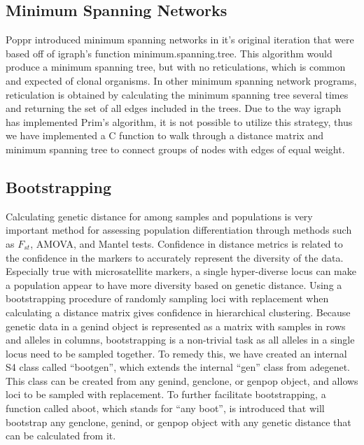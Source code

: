 \documentclass{frontiersSCNS} %
\begin{document}
\subsection*{Minimum Spanning Networks}\label{minimum-spanning-networks}

Poppr introduced minimum spanning networks in it's original iteration
that were based off of igraph's function minimum.spanning.tree. This
algorithm would produce a minimum spanning tree, but with no
reticulations, which is common and expected of clonal organisms. In
other minimum spanning network programs, reticulation is obtained by
calculating the minimum spanning tree several times and returning the
set of all edges included in the trees. Due to the way igraph has
implemented Prim's algorithm, it is not possible to utilize this
strategy, thus we have implemented a C function to walk through a
distance matrix and minimum spanning tree to connect groups of nodes
with edges of equal weight.

\subsection*{Bootstrapping}\label{bootstrapping}

Calculating genetic distance for among samples and populations is very
important method for assessing population differentiation through
methods such as \(F_{st}\), AMOVA, and Mantel tests. Confidence in
distance metrics is related to the confidence in the markers to
accurately represent the diversity of the data. Especially true with
microsatellite markers, a single hyper-diverse locus can make a
population appear to have more diversity based on genetic distance.
Using a bootstrapping procedure of randomly sampling loci with
replacement when calculating a distance matrix gives confidence in
hierarchical clustering. Because genetic data in a genind object is
represented as a matrix with samples in rows and alleles in columns,
bootstrapping is a non-trivial task as all alleles in a single locus
need to be sampled together. To remedy this, we have created an internal
S4 class called ``bootgen'', which extends the internal ``gen'' class
from adegenet. This class can be created from any genind, genclone, or
genpop object, and allows loci to be sampled with replacement. To
further facilitate bootstrapping, a function called aboot, which stands
for ``any boot'', is introduced that will bootstrap any genclone,
genind, or genpop object with any genetic distance that can be
calculated from it.
\end{document}
